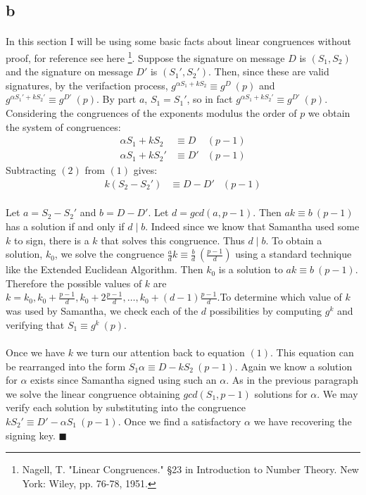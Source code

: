 \documentclass[letterpaper,12pt,oneside,onecolumn]{report}
\begin{document}
\subsection*{b}
\paragraph{}
In this section I will be using some basic facts about linear congruences without proof, for reference see here \footnote{Nagell, T. "Linear Congruences." §23 in Introduction to Number Theory. New York: Wiley, pp. 76-78, 1951.}. Suppose the signature on message $D$ is $(S_1,S_2)$ and the signature on message $D'$ is $(S_1', S_2')$. Then, since these are valid signatures, by the verifaction process, $g^{\alpha S_1 + kS_2} \equiv g^D\ (p)$ and $g^{\alpha S_1' + kS_2'} \equiv g^{D'}\ (p)$. By part $a$, $S_1 = S_1'$, so in fact $g^{\alpha S_1 + kS_2'} \equiv g^{D'}\ (p)$. Considering the congruences of the exponents modulus the order of $p$ we obtain the system of congruences:
\begin{align}
\alpha S_1 + k S_2 &\equiv D &(p-1) \\
\alpha S_1 + k S_2' &\equiv D' &(p-1)
\end{align}
Subtracting $(2)$ from $(1)$ gives:
\begin{align}
k(S_2 - S_2') &\equiv D-D' &(p-1)
\end{align}
\paragraph{}
Let $a = S_2 - S_2'$ and $b = D - D'$. Let $d = gcd(a, p-1)$. Then $ak \equiv b\ (p-1)$ has a solution if and only if $d \mid b$. Indeed since we know that Samantha used some $k$ to sign, there is a $k$ that solves this congruence. Thus $d \mid b$. To obtain a solution, $k_0$, we solve the congruence $\frac{a}{d}k \equiv \frac{b}{d}\ (\frac{p-1}{d})$ using a standard technique like the Extended Euclidean Algorithm. Then $k_0$ is a solution to $ak \equiv b\ (p-1)$. Therefore the possible values of $k$ are $k = k_0, k_0 + \frac{p-1}{d}, k_0 + 2\frac{p-1}{d}, \dots, k_0 + (d-1)\frac{p-1}{d}$.To determine which value of $k$ was used by Samantha, we check each of the $d$ possibilities by computing $g^k$ and verifying that $S_1 \equiv g^k\ (p)$.
\paragraph{}
Once we have $k$ we turn our attention back to equation $(1)$. This equation can be rearranged into the form $S_1 \alpha \equiv D - kS_2\ (p-1)$. Again we know a solution for $\alpha$ exists since Samantha signed using such an $\alpha$. As in the previous paragraph we solve the linear congruence obtaining $gcd(S_1, p-1)$ solutions for $\alpha$. We may verify each solution by substituting into the congruence $kS_2' \equiv D' - \alpha S_1\ (p-1)$. Once we find a satisfactory $\alpha$ we have recovering the signing key. $\blacksquare$
\end{document}

